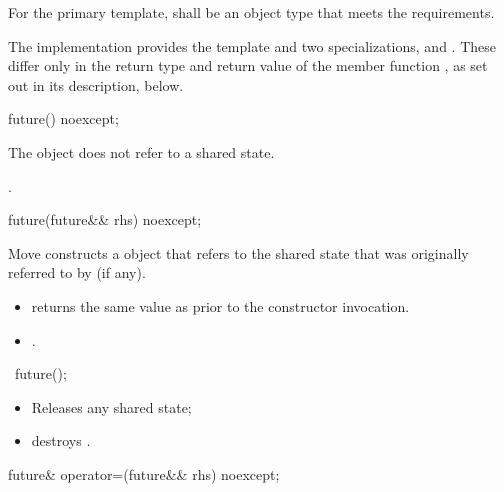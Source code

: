 \pnum
For the primary template,  shall be an object type that
meets the  requirements.

\pnum
The implementation provides the template  and two specializations,
 and . These differ only in the return type and return
value of the member function , as set out in its description, below.

%
\begin{itemdecl}
future() noexcept;
\end{itemdecl}

\begin{itemdescr}
\pnum
\effects
The object does not refer to a shared state.

\pnum
\ensures
{}.
\end{itemdescr}

%
\begin{itemdecl}
future(future&& rhs) noexcept;
\end{itemdecl}

\begin{itemdescr}
\pnum
\effects
Move constructs a  object that refers to the shared
state that
was originally referred to by  (if any).

\pnum
\ensures
\begin{itemize}
\item {} returns the same value as  prior to the
constructor invocation.
\item {}.
\end{itemize}
\end{itemdescr}

%
\begin{itemdecl}
~future();
\end{itemdecl}

\begin{itemdescr}
\pnum
\effects
\begin{itemize}
\item
Releases any shared state;
\item
destroys .
\end{itemize}
\end{itemdescr}

%
\begin{itemdecl}
future& operator=(future&& rhs) noexcept;
\end{itemdecl}

